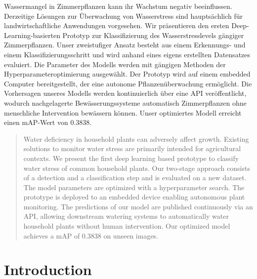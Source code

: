 \documentclass[final]{vutinfth} %
\begin{document}
\begin{kurzfassung}
  Wassermangel in Zimmerpflanzen kann ihr Wachstum negativ
  beeinflussen. Derzeitige Lösungen zur Überwachung von Wasserstress
  sind hauptsächlich für landwirtschaftliche Anwendungen
  vorgesehen. Wir präsentieren den ersten Deep-Learning-basierten
  Prototyp zur Klassifizierung des Wasserstresslevels gängiger
  Zimmerpflanzen. Unser zweistufiger Ansatz besteht aus einem
  Erkennungs- und einem Klassifizierungsschritt und wird anhand eines
  eigens erstellten Datensatzes evaluiert. Die Parameter des Modells
  werden mit gängigen Methoden der Hyperparameteroptimierung
  ausgewählt. Der Prototyp wird auf einem embedded Computer
  bereitgestellt, der eine autonome Pflanzenüberwachung
  ermöglicht. Die Vorhersagen unseres Modells werden kontinuierlich
  über eine API veröffentlicht, wodurch nachgelagerte
  Bewässerungssysteme automatisch Zimmerpflanzen ohne menschliche
  Intervention bewässern können. Unser optimiertes Modell erreicht
  einen mAP-Wert von \num{0.3838}.
\end{kurzfassung}

\begin{abstract}
  Water deficiency in household plants can adversely affect
  growth. Existing solutions to monitor water stress are primarily
  intended for agricultural contexts. We present the first deep
  learning based prototype to classify water stress of common
  household plants. Our two-stage approach consists of a detection and
  a classification step and is evaluated on a new dataset. The model
  parameters are optimized with a hyperparameter search. The prototype
  is deployed to an embedded device enabling autonomous plant
  monitoring. The predictions of our model are published continuously
  via an API, allowing downstream watering systems to automatically
  water household plants without human intervention. Our optimized
  model achieves a mAP of \num{0.3838} on unseen images.
\end{abstract}


\tableofcontents %

\mainmatter

\chapter{Introduction}
\label{chap:introduction}
\end{document}
